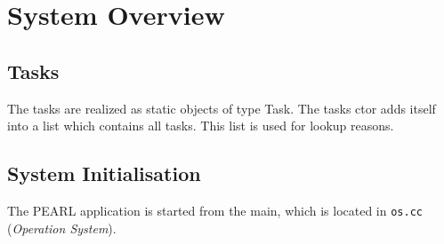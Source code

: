 \section{System Overview}

\subsection{Tasks}
The tasks are realized as static objects of type Task.
The tasks ctor adds itself into a list which contains all tasks.
This list is used for lookup reasons. 

\subsection{System Initialisation}
The PEARL application is started from the main, which is located in 
\verb|os.cc| ({\em Operation System}).

